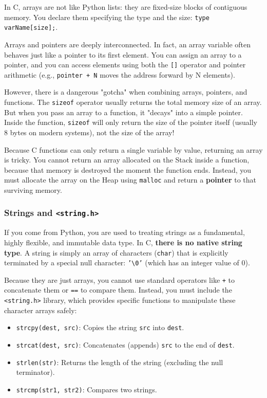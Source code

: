 In C, arrays are not like Python lists: they are fixed-size blocks of contiguous memory. You declare them specifying the type and the size: \texttt{type varName[size];}. 

Arrays and pointers are deeply interconnected. In fact, an array variable often behaves just like a pointer to its first element. You can assign an array to a pointer, and you can access elements using both the \texttt{[]} operator and pointer arithmetic (e.g., \texttt{pointer + N} moves the address forward by N elements).

However, there is a dangerous "gotcha" when combining arrays, pointers, and functions. The \texttt{sizeof} operator usually returns the total memory size of an array. But when you pass an array to a function, it "decays" into a simple pointer. Inside the function, \texttt{sizeof} will only return the size of the pointer itself (usually 8 bytes on modern systems), not the size of the array!

Because C functions can only return a single variable by value, returning an array is tricky. You cannot return an array allocated on the Stack inside a function, because that memory is destroyed the moment the function ends. Instead, you must allocate the array on the Heap using \texttt{malloc} and return a \textbf{pointer} to that surviving memory.



\subsubsection{Strings and \texttt{<string.h>}}

If you come from Python, you are used to treating strings as a fundamental, highly flexible, and immutable data type. In C, \textbf{there is no native string type}. A string is simply an array of characters (\texttt{char}) that is explicitly terminated by a special null character: \texttt{'\textbackslash0'} (which has an integer value of 0). 

Because they are just arrays, you cannot use standard operators like \texttt{+} to concatenate them or \texttt{==} to compare them. Instead, you must include the \texttt{<string.h>} library, which provides specific functions to manipulate these character arrays safely:
\begin{itemize}
    \item[-] \texttt{strcpy(dest, src)}: Copies the string \texttt{src} into \texttt{dest}.
    \item[-] \texttt{strcat(dest, src)}: Concatenates (appends) \texttt{src} to the end of \texttt{dest}.
    \item[-] \texttt{strlen(str)}: Returns the length of the string (excluding the null terminator).
    \item[-] \texttt{strcmp(str1, str2)}: Compares two strings.
\end{itemize}

